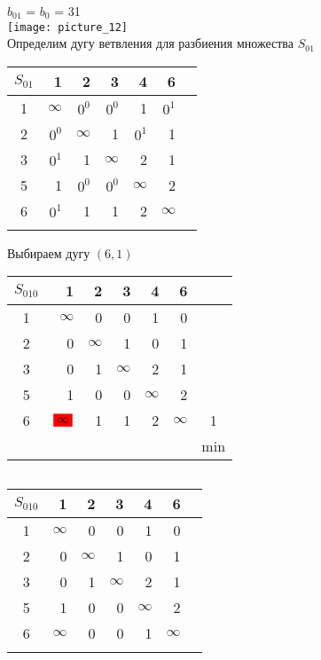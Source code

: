 \documentclass[12pt]{article}
\begin{document}
$b_{01}$ = $b_0$  = 31\\

\texttt{[image: picture\_12]}\\

Определим дугу ветвления для разбиения множества $S_{01}$\\

\begin{flushleft}
 \begin{tabular}{c||rrrrr||c}
$S_{01}$ & 1 &2 & 3 & 4 & 6 & \\
\hline
\hline
1 & $\infty$ & $0^0$ & $0^0$ & 1  & $0^1$ & \\
2 & $0^0$ & $\infty$ & 1 & $0^1$  & 1 & \\
3 & $0^1$ & 1 & $\infty$ & 2  & 1 & \\
5 & 1 & $0^0$ & $0^0$ & $\infty$  & 2 \\
6 & $0^1$ & 1 & 1 & 2 & $\infty$ & \\
\hline
\hline
 &  &   &  &  &  &  \\
\end{tabular}
\end{flushleft}

Выбираем дугу $(6,1)$

\begin{flushleft}
 \begin{tabular}{c||rrrrr||c}
$S_{010}$ & 1 &2 & 3 & 4 & 6 & \\
\hline
\hline
1 & $\infty$ & 0 & 0 & 1  & 0 & \\
2 & 0 & $\infty$ & 1 & 0  & 1 & \\
3 & 0 & 1 & $\infty$ & 2  & 1 & \\
5 & 1 & 0 & 0 & $\infty$  & 2 \\
6 & $\colorbox{red}{$\infty$}$ & 1 & 1 & 2 & $\infty$ & 1\\
\hline
\hline
 &  &   &  &  &  & min \\
\end{tabular}
$\qquad $ 
 \begin{tabular}{c||rrrrr||c}
$S_{010}$ & 1 &2 & 3 & 4 & 6 & \\
\hline
\hline
1 & $\infty$ & 0 & 0 & 1  & 0 & \\
2 & 0 & $\infty$ & 1 & 0  & 1 & \\
3 & 0 & 1 & $\infty$ & 2  & 1 & \\
5 & 1 & 0 & 0 & $\infty$  & 2 \\
6 & $\infty$ & 0 & 0 & 1 & $\infty$ & \\
\hline
\hline
 & &   &  &  &  & \\
\end{tabular}
\end{flushleft}
\end{document}
